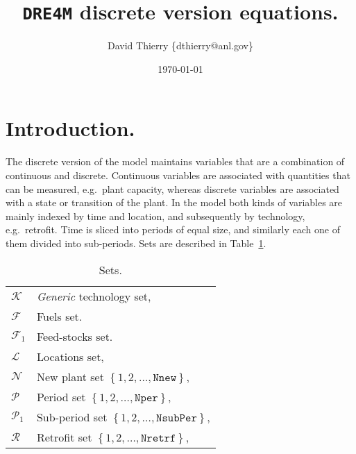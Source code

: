 \documentclass{amsart}
\begin{document}
\title{\texttt{DRE4M} discrete version equations.}
\author{David Thierry \{dthierry@anl.gov\}}

\date{\today}
\maketitle

\section{Introduction.}
%
The discrete version of the model maintains variables that are a combination of
continuous and discrete. Continuous variables are associated with quantities
that can be measured, e.g.\ plant capacity, whereas discrete variables are
associated with a state or transition of the plant. 
%
In the model both kinds of variables are mainly indexed by time and
location, and subsequently by technology, e.g.\ retrofit. 
%
Time is sliced into periods of equal size, and similarly each one of them
divided into sub-periods. Sets are described in Table~\ref{tab:sets}.
%
\begin{table}[h]
    \caption{Sets.}
    \begin{tabular}{@{}ll@{}}
        $\mathcal{K}$ & \textit{Generic} technology set,\\
        $\mathcal{F}$ & Fuels set.\\
        $\mathcal{F}_1$	& Feed-stocks set.\\
        $\mathcal{L}$ & Locations set,\\
        $\mathcal{N}$ & New plant set $\left\{1,2,\dots,\mathtt{Nnew}\right\}$,\\
        $\mathcal{P}$	& Period set $\left\{1,2,\dots,\mathtt{Nper}\right\}$, \\
        $\mathcal{P}_1$	& Sub-period set $\left\{1,2,\dots,\mathtt{NsubPer}\right\}$,\\
        $\mathcal{R}$ & Retrofit set $\left\{1,2,\dots,\mathtt{Nretrf}\right\}$,\\
    \end{tabular}\label{tab:sets}
\end{table}
%
\end{document}
